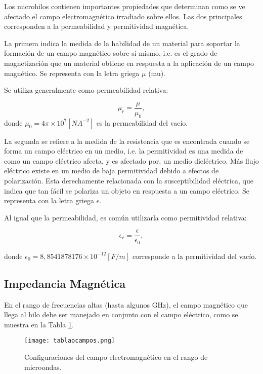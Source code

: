 \documentclass[12pt,letterpaper]{article}
\numberwithin{equation}{section}
\begin{document}
Los microhilos contienen importantes propiedades que determinan como se ve afectado el campo electromagnético irradiado sobre ellos. Las dos principales corresponden a la permeabilidad y permitividad magnética. 

La primera indica la medida de la habilidad de un material para soportar la formación de un campo magnético sobre sí mismo, i.e. es el grado de magnetización que un material obtiene en respuesta a la aplicación de un campo magnético. Se representa con la letra griega $\mu$ (mu). 

Se utiliza generalmente como permeabilidad relativa:

\begin{equation}
\mu_{r}  = \frac{\mu}{\mu_{0}},
\end{equation}
donde $\mu_{0} = 4 \pi \times 10^7 [N A^{-2}]$ es la permeabilidad del vacío. 

La segunda se refiere a la medida de la resistencia que es encontrada cuando se forma un campo eléctrico en un medio, i.e. la permitividad es una medida de como un campo eléctrico afecta, y es afectado por, un medio dieléctrico. Más flujo eléctrico existe en un medio de baja permitividad debido a efectos de polarización. Esta derechamente relacionada con la susceptibilidad eléctrica, que indica que tan fácil se polariza un objeto en respuesta a un campo eléctrico. Se representa con la letra griega $\epsilon$.

Al igual que la permeabilidad, es común utilizarla como permitividad relativa:

\begin{equation}
\epsilon_{r}  = \frac{\epsilon}{\epsilon_{0}},
\end{equation}

\noindent donde $\epsilon_{0} = 8,8541878176 \times 10^{-12} [F/m]$ corresponde a la permitividad del vacío.

\subsection{Impedancia Magnética}

En el rango de frecuencias altas (hasta algunos GHz), el campo magnético que llega al hilo debe ser manejado en conjunto con el campo eléctrico, como se muestra en la Tabla \ref{fig: tablacampos}.

\begin{figure}[H]
	\centering\texttt{[image: tablaocampos.png]}
	\caption{Configuraciones del campo electromagnético en el rango de microondas. \cite{Wire_theory_2}}
	\label{fig: tablacampos}
\end{figure} 
\end{document}
